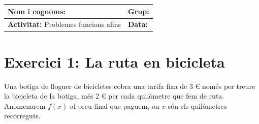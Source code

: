 \documentclass[12pt,a4paper]{article}
\begin{document}
\begingroup
\renewcommand{\arraystretch}{2.2}
\begin{tabularx}{\textwidth}{|X|p{4cm}|}
    \hline
    \textbf{Nom i cognoms:} & \textbf{Grup:} \\ \hline
    \textbf{Activitat:} Problemes funcions afins & \textbf{Data:} \\ \hline
\end{tabularx}
\endgroup



\section*{Exercici 1: La ruta en bicicleta}
Una botiga de lloguer de bicicletes cobra una tarifa fixa de 3 € només per treure la bicicleta de la botiga, més 2 € per cada quilòmetre que fem de ruta. Anomenarem $f(x)$ al preu final que paguem, on $x$ són els quilòmetres recorreguts.
\end{document}
